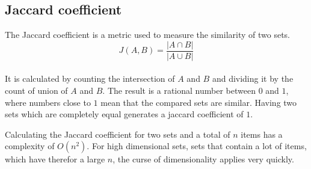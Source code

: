 \subsection{Jaccard coefficient}

The Jaccard coefficient is a metric used to measure the similarity of two sets.\\

\begin{equation}
    J(A,B) = \frac{ | A \cap B | }{ | A \cup B | }
\end{equation}\\

It is calculated by counting the intersection of $ A $ and $ B $ and dividing it by the count of union of $ A $ and $ B $. The result is a rational number between $ 0 $ and $ 1 $, where numbers close to $ 1 $ mean that the compared sets are similar. Having two sets which are completely equal generates a jaccard coefficient of $ 1 $.\\

\begin{figure}[h]
     
        
\end{figure}


Calculating the Jaccard coefficient for two sets and a total of $ n $ items has a complexity of $ O(n^2) $. For high dimensional sets, sets that contain a lot of items, which have therefor a large $ n $, the curse of dimensionality applies very quickly.\\